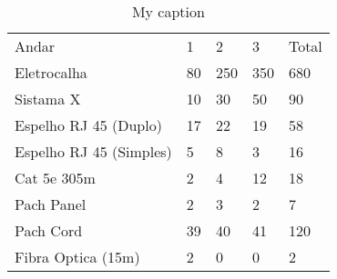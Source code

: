 \begin{table}[H]
\centering
\caption{My caption}
\label{my-label}
\begin{tabular}{lllll}
Andar                   & 1  & 2   & 3   & Total \\
Eletrocalha             & 80 & 250 & 350 & 680   \\
Sistama X               & 10 & 30  & 50  & 90    \\
Espelho RJ 45 (Duplo)   & 17 & 22  & 19  & 58    \\
Espelho RJ 45 (Simples) & 5  & 8   & 3   & 16    \\
Cat 5e 305m             & 2  & 4   & 12  & 18    \\
Pach Panel              & 2  & 3   & 2   & 7     \\
Pach Cord               & 39 & 40  & 41  & 120   \\
Fibra Optica (15m)      & 2  & 0   & 0   & 2    
\end{tabular}
\end{table}